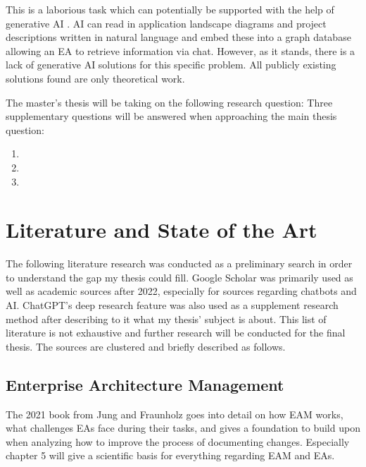 \documentclass[english]{lni}
\begin{document}
This is a laborious task which can potentially be supported with the help of generative AI \cite{ramachandran2025transforming}. AI can read in application landscape diagrams and project descriptions written in natural language and embed these into a graph database allowing an EA to retrieve information via chat. However, as it stands, there is a lack of generative AI solutions for this specific problem. All publicly existing solutions found are only theoretical work.

The master's thesis will be taking on the following research question:  Three supplementary questions will be answered when approaching the main thesis question:
\begin{enumerate}
    \item {}
    \item {}
    \item {}
\end{enumerate}


\section{Literature and State of the Art}
The following literature research was conducted as a preliminary search in order to understand the gap my thesis could fill. Google Scholar was primarily used as well as academic sources after 2022, especially for sources regarding chatbots and AI. ChatGPT's deep research feature was also used as a supplement research method after describing to it what my thesis' subject is about. This list of literature is not exhaustive and further research will be conducted for the final thesis. The sources are clustered and briefly described as follows.

\subsection{Enterprise Architecture Management}
The 2021 book from Jung and Fraunholz \cite{jung2021masterclass} goes into detail on how EAM works, what challenges EAs face during their tasks, and gives a foundation to build upon when analyzing how to improve the process of documenting changes. Especially chapter 5 will give a scientific basis for everything regarding EAM and EAs.
\end{document}
